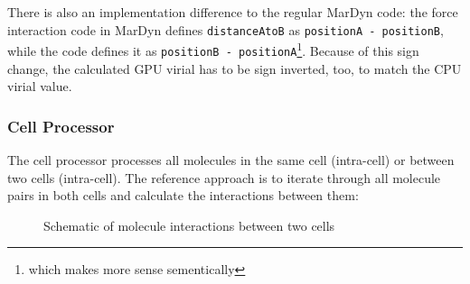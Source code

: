 There is also an implementation difference to the regular MarDyn code: the force interaction code in MarDyn defines \lstinline!distanceAtoB! as \lstinline!positionA - positionB!, while the \cuda{} code defines it as \lstinline!positionB - positionA!\footnote{which makes more sense sementically}. Because of this sign change, the calculated GPU virial has to be sign inverted, too, to match the CPU virial value.

\subsubsection{Cell Processor}
The cell processor processes all molecules in the same cell (intra-cell) or between two cells (intra-cell).
The reference approach is to iterate through all molecule pairs in both cells and calculate the interactions between them:
\begin{figure}
  \centering
  \caption{Schematic of molecule interactions between two cells}
\end{figure}

